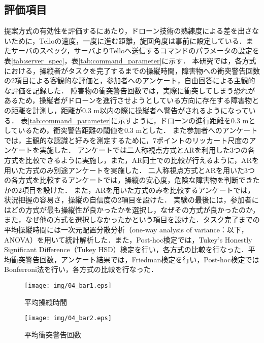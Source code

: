 \documentclass[submit]{ipsj}
\begin{document}
\subsection{評価項目}
提案方式の有効性を評価するにあたり，ドローン技術の熟練度による差を出さないために，Telloの速度，一度に進む距離，旋回角度は事前に設定している．またサーバのスペック，サーバよりTelloへ送信するコマンドのパラメータの設定を表\ref{tab:server_spec}，表\ref{tab:command_parameter}に示す．
本研究では，各方式における，操縦者がタスクを完了するまでの操縦時間，障害物への衝突警告回数の2項目による客観的な評価と，参加者へのアンケート，自由回答による主観的な評価を記録した．
障害物の衝突警告回数では，実際に衝突してしまう恐れがあるため，操縦者がドローンを進行させようとしている方向に存在する障害物との距離を計測し，距離が0.3 m以内の際に操縦者へ警告がされるようになっている．
表\ref{tab:command_parameter}に示すように，ドローンの進行距離を0.3 mとしているため，衝突警告距離の閾値を0.3 mとした．
また参加者へのアンケートでは，主観的な認識と好みを測定するために，7ポイントのリッカート尺度のアンケートを実施した．
アンケートでは二人称視点方式とARを利用した3つの各方式を比較できるように実施し，また，AR同士での比較が行えるように，ARを用いた方式のみ別途アンケートを実施した．
二人称視点方式とARを用いた3つの各方式を比較するアンケートでは，操縦の安心度，危険な障害物を判断できたかの2項目を設けた．
また，ARを用いた方式のみを比較するアンケートでは，状況把握の容易さ，操縦の自信度の2項目を設けた．
実験の最後には，参加者にはどの方式が最も操縦性が良かったかを選択し，なぜその方式が良かったのか，また，なぜ他の方式を選択しなかったかという項目を設けた．タスク完了までの平均操縦時間には一次元配置分散分析（one-way analysis of variance：以下，ANOVA）を用いて統計解析した．また，Post-hoc検定では，Tukey’s Honestly Significant Difference（Tukey HSD）検定を行い，各方式の比較を行なった．平均衝突警告回数，アンケート結果では，Friedman検定を行い，Post-hoc検定ではBonferroni法を行い，各方式の比較を行なった．


\begin{figure}[tb]
\centering
\texttt{[image: img/04\_bar1.eps]}
\caption{平均操縦時間}
\label{fig:04_bar1}
\end{figure}

\begin{figure}[tb]
\centering
\texttt{[image: img/04\_bar2.eps]}
\caption{平均衝突警告回数}
\label{fig:04_bar2}
\end{figure}
\end{document}
